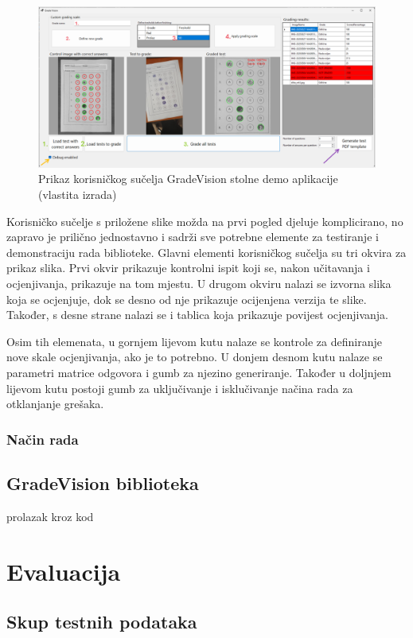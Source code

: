 \documentclass{foi}
\begin{document}
\begin{figure}[H]
\centering
\includegraphics[width=1.0\linewidth]{slike/GradeVision ui.png}
\caption{Prikaz korisničkog sučelja GradeVision stolne demo aplikacije (vlastita izrada)}
\end{figure}

Korisničko sučelje s priložene slike možda na prvi pogled djeluje komplicirano, no zapravo je prilično jednostavno i sadrži sve potrebne elemente za testiranje i demonstraciju rada biblioteke. Glavni elementi korisničkog sučelja su tri okvira za prikaz slika. Prvi okvir prikazuje kontrolni ispit koji se, nakon učitavanja i ocjenjivanja, prikazuje na tom mjestu. U drugom okviru nalazi se izvorna slika koja se ocjenjuje, dok se desno od nje prikazuje ocijenjena verzija te slike. Također, s desne strane nalazi se i tablica koja prikazuje povijest ocjenjivanja.

Osim tih elemenata, u gornjem lijevom kutu nalaze se kontrole za definiranje nove skale ocjenjivanja, ako je to potrebno. U donjem desnom kutu nalaze se parametri matrice odgovora i gumb za njezino generiranje. Također u doljnjem lijevom kutu postoji gumb za uključivanje i isklučivanje načina rada za otklanjanje grešaka.

\subsection{Način rada}
\section{GradeVision biblioteka}
prolazak kroz kod
\chapter{Evaluacija}
\section{Skup testnih podataka}
\end{document}
